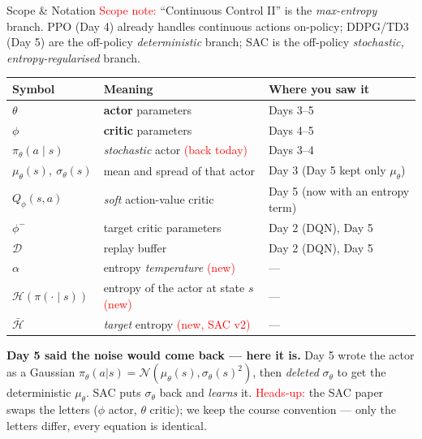\begin{frame}{Scope \& Notation}
\vspace{-0.3em}
{\footnotesize \textcolor{red}{Scope note:} ``Continuous Control II'' is the \emph{max-entropy} branch. PPO (Day 4) already handles continuous actions on-policy; DDPG/TD3 (Day 5) are the off-policy \emph{deterministic} branch; SAC is the off-policy \emph{stochastic, entropy-regularised} branch.}
\vspace{-0.2em}
\begin{center}
\small
\renewcommand{\arraystretch}{1.0}
\begin{tabular}{@{}lll@{}}
\hline
\textbf{Symbol} & \textbf{Meaning} & \textbf{Where you saw it} \\
\hline
$\theta$                        & \textbf{actor} parameters                         & Days 3--5 \\
$\phi$                          & \textbf{critic} parameters                        & Days 4--5 \\
$\pi_\theta(a\mid s)$           & \emph{stochastic} actor \;\textcolor{red}{(back today)} & Days 3--4 \\
$\mu_\theta(s),\ \sigma_\theta(s)$ & mean and spread of that actor                  & Day 3 (Day 5 kept only $\mu_\theta$) \\
$Q_\phi(s,a)$                   & \emph{soft} action-value critic                   & Day 5 (now with an entropy term) \\
$\phi^{-}$                      & target critic parameters                          & Day 2 (DQN), Day 5 \\
$\mathcal{D}$                   & replay buffer                                     & Day 2 (DQN), Day 5 \\
$\alpha$                        & entropy \emph{temperature} \;\textcolor{red}{(new)} & --- \\
$\mathcal{H}(\pi(\cdot\mid s))$ & entropy of the actor at state $s$ \;\textcolor{red}{(new)} & --- \\
$\bar{\mathcal{H}}$             & \emph{target} entropy \;\textcolor{red}{(new, SAC v2)} & --- \\
\hline
\end{tabular}
\end{center}
\vspace{0.3em}
{\scriptsize \textbf{Day 5 said the noise would come back --- here it is.} Day 5 wrote the actor as a Gaussian $\pi_\theta(a|s)=\mathcal{N}(\mu_\theta(s),\sigma_\theta(s)^2)$, then \emph{deleted} $\sigma_\theta$ to get the deterministic $\mu_\theta$. SAC puts $\sigma_\theta$ back and \emph{learns} it. \;\textcolor{red}{Heads-up:} the SAC paper swaps the letters ($\phi$ actor, $\theta$ critic); we keep the course convention --- only the letters differ, every equation is identical.}
\end{frame}
